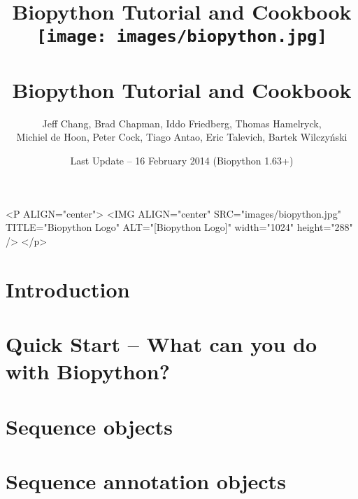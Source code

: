 \documentclass{report}
\begin{document}
\begin{htmlonly}
\title{Biopython Tutorial and Cookbook}
\end{htmlonly}
\begin{latexonly}
\title{
\texttt{[image: images/biopython.jpg]}\\
~\\
Biopython Tutorial and Cookbook}
\end{latexonly}

\author{Jeff Chang, Brad Chapman, Iddo Friedberg, Thomas Hamelryck, \\
Michiel de Hoon, Peter Cock, Tiago Antao, Eric Talevich, Bartek Wilczy\'{n}ski}
\date{Last Update -- 16 February 2014 (Biopython 1.63+)}

\begin{rawhtml}
<P ALIGN="center">
<IMG ALIGN="center" SRC="images/biopython.jpg" TITLE="Biopython Logo" ALT="[Biopython Logo]" width="1024" height="288" />
</p>
\end{rawhtml}

\maketitle
\tableofcontents

\chapter{Introduction}
\label{chapter:introduction}


\chapter{Quick Start -- What can you do with Biopython?}
\label{chapter:quick-start}


\chapter{Sequence objects}
\label{chapter:Bio.Seq}


\chapter{Sequence annotation objects}
\label{chapter:SeqRecord}

\end{document}
